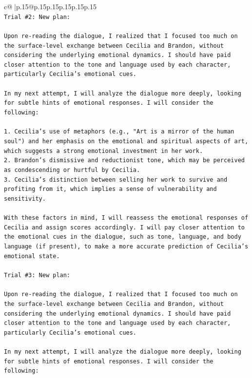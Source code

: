 \documentclass{article}
\begin{document}
{\begin{supertabular}{c@{$\;$}|p{.15\linewidth}@{}p{.15\linewidth}p{.15\linewidth}p{.15\linewidth}p{.15\linewidth}p{.15\linewidth}}
{{{\\ 
\texttt{Trial \#2: New plan: } \\
\\ 
\texttt{Upon re{-}reading the dialogue, I realized that I focused too much on the surface{-}level exchange between Cecilia and Brandon, without considering the underlying emotional dynamics. I should have paid closer attention to the tone and language used by each character, particularly Cecilia's emotional cues. } \\
\\ 
\texttt{In my next attempt, I will analyze the dialogue more deeply, looking for subtle hints of emotional responses. I will consider the following:} \\
\\ 
\texttt{1. Cecilia's use of metaphors (e.g., "Art is a mirror of the human soul") and her emphasis on the emotional and spiritual aspects of art, which suggests a strong emotional investment in her work.} \\
\texttt{2. Brandon's dismissive and reductionist tone, which may be perceived as condescending or hurtful by Cecilia.} \\
\texttt{3. Cecilia's distinction between selling her work to survive and profiting from it, which implies a sense of vulnerability and sensitivity.} \\
\\ 
\texttt{With these factors in mind, I will reassess the emotional responses of Cecilia and assign scores accordingly. I will pay closer attention to the emotional cues in the dialogue, such as tone, language, and body language (if present), to make a more accurate prediction of Cecilia's emotional state.} \\
\\ 
\texttt{Trial \#3: New plan: } \\
\\ 
\texttt{Upon re{-}reading the dialogue, I realized that I focused too much on the surface{-}level exchange between Cecilia and Brandon, without considering the underlying emotional dynamics. I should have paid closer attention to the tone and language used by each character, particularly Cecilia's emotional cues. } \\
\\ 
\texttt{In my next attempt, I will analyze the dialogue more deeply, looking for subtle hints of emotional responses. I will consider the following:} \\
\\ 
}}}
\end{supertabular}}
\end{document}
